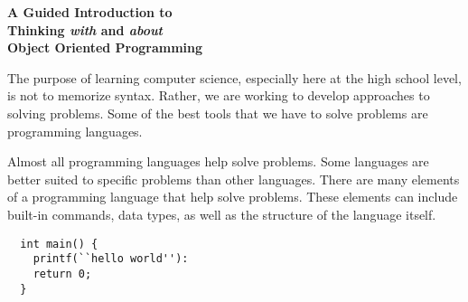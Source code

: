 \documentclass{article}
\begin{document}
\begin{comment}

  1. Explain why object oriented programming
  2. Rabbit example
  3. Work backwards from Pokemon-like linked list example
  

\end{comment}

\begin{center}

 \textbf{A Guided Introduction to \\
  Thinking \textit{with} and \textit{about} \\ 
  Object Oriented Programming \\
}
\end{center}

\begin{flushleft}

  The purpose of learning computer science, especially here at the high school level, is not to memorize syntax. Rather, we are working to develop approaches to solving problems. Some of the best tools that we have to solve problems are programming languages.\par
  Almost all programming languages help solve problems. Some languages are better suited to specific problems than other languages. There are many elements of a programming language that help solve problems. These elements can include built-in commands, data types, as well as the structure of the language itself.\par
  
\end{flushleft}


\begin{verbatim}
  int main() {
    printf(``hello world''):
    return 0;
  }
\end{verbatim}
\end{document}
